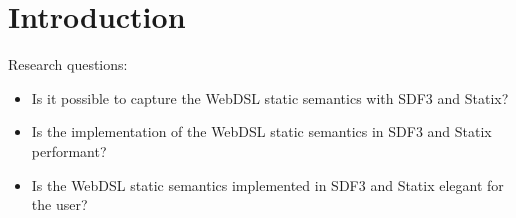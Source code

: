 
\chapter{\label{chap:introduction}Introduction}

  Research questions:
  \begin{itemize}
    \item Is it possible to capture the WebDSL static semantics with SDF3 and Statix?
    \item Is the implementation of the WebDSL static semantics in SDF3 and Statix performant?
    \item Is the WebDSL static semantics implemented in SDF3 and Statix elegant for the user?
  \end{itemize}
